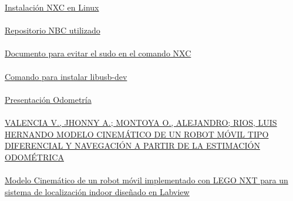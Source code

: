 \documentclass[oneside,twocolumn]{article}
\begin{document}
\begin{thebibliography}{0} %

  \href{http://ubuntudaily.blogspot.com/2011/03/using-lego-mindstorms-nxt-with-ubuntu.html}{Instalación NXC en Linux}\\\\
  \href{https://github.com/pierre-24/nbc-compiler}{Repositorio NBC utilizado}\\\\
  \href{https://bricxcc.sourceforge.net/nbc/doc/nxtlinux.txt}{Documento para evitar el sudo en el comando NXC}\\\\
  \href{https://howtoinstall.co/en/libusb-dev}{Comando para instalar libusb-dev}\\\\
  \href{http://www.kramirez.net/Robotica/Material/Presentaciones/Odometria.pdf}{Presentación Odometría}\\\\
  \href{https://www.redalyc.org/pdf/849/84916680034.pdf}{VALENCIA V., JHONNY A.; MONTOYA O., ALEJANDRO; RIOS, LUIS HERNANDO
MODELO CINEMÁTICO DE UN ROBOT MÓVIL TIPO DIFERENCIAL Y NAVEGACIÓN A PARTIR DE
LA ESTIMACIÓN ODOMÉTRICA}\\\\
  \href{https://www.google.com/url?sa=t&rct=j&q=&esrc=s&source=web&cd=&cad=rja&uact=8&ved=2ahUKEwiu0_So28_9AhViDkQIHRlXDtcQFnoECBQQAQ&url=https%3A%2F%2Frevistas.udistrital.edu.co%2Findex.php%2FTecnura%2Farticle%2Fdownload%2F6810%2F8394%2F30717&usg=AOvVaw2PsCrkFGkk_nGN-G084B11}{Modelo Cinemático de un robot móvil implementado con LEGO NXT para un sistema de localización indoor diseñado en Labview}
  
  
\end{thebibliography}

\end{document}
